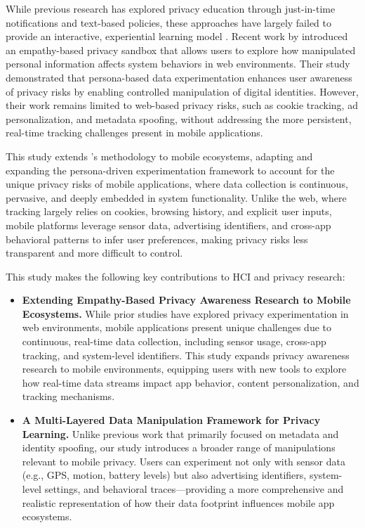 \documentclass[acmlarge, nonacm]{acmart}
\begin{document}
While previous research has explored privacy education through just-in-time notifications and text-based policies, these approaches have largely failed to provide an interactive, experiential learning model \cite{feng2021yaodesign}. Recent work by \citet{Chaoran2023EmpathySandbox} introduced an empathy-based privacy sandbox that allows users to explore how manipulated personal information affects system behaviors in web environments. Their study demonstrated that persona-based data experimentation enhances user awareness of privacy risks by enabling controlled manipulation of digital identities. However, their work remains limited to web-based privacy risks, such as cookie tracking, ad personalization, and metadata spoofing, without addressing the more persistent, real-time tracking challenges present in mobile applications.

This study extends \citet{Chaoran2023EmpathySandbox}'s methodology to mobile ecosystems, adapting and expanding the persona-driven experimentation framework to account for the unique privacy risks of mobile applications, where data collection is continuous, pervasive, and deeply embedded in system functionality. Unlike the web, where tracking largely relies on cookies, browsing history, and explicit user inputs, mobile platforms leverage sensor data, advertising identifiers, and cross-app behavioral patterns to infer user preferences, making privacy risks less transparent and more difficult to control.

This study makes the following key contributions to HCI and privacy research:
\begin{itemize}
    \item 

    \textbf{Extending Empathy-Based Privacy Awareness Research to Mobile Ecosystems.}
While prior studies have explored privacy experimentation in web environments, mobile applications present unique challenges due to continuous, real-time data collection, including sensor usage, cross-app tracking, and system-level identifiers. This study expands privacy awareness research to mobile environments, equipping users with new tools to explore how real-time data streams impact app behavior, content personalization, and tracking mechanisms.
    
    \item \textbf{A Multi-Layered Data Manipulation Framework for Privacy Learning.}
Unlike previous work that primarily focused on metadata and identity spoofing, our study introduces a broader range of manipulations relevant to mobile privacy. Users can experiment not only with sensor data (e.g., GPS, motion, battery levels) but also advertising identifiers, system-level settings, and behavioral traces—providing a more comprehensive and realistic representation of how their data footprint influences mobile app ecosystems.
\end{itemize}
\end{document}
